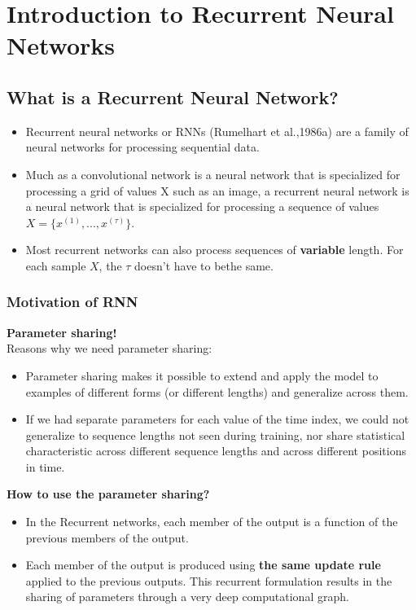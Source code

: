 \chapter{Introduction to Recurrent Neural Networks}

	\section{What is a Recurrent Neural Network?}
	
	\begin{itemize}
		\item Recurrent neural networks or RNNs (Rumelhart et al.,1986a) are a family of
		neural networks for processing sequential data.
		\item  Much as a convolutional network is a neural network that is specialized for processing a grid of values X such as an image, a recurrent neural network is a neural network that is specialized for
		processing a sequence of values $X = \{x^{(1)}, . . . , x^{(\tau)}\}$.
		\item Most recurrent networks can also process sequences of \textbf{variable} length. For each sample $X$, the $\tau$ doesn't have to bethe same.
	\end{itemize}
	
	\subsection{Motivation of RNN}
		\textbf{Parameter sharing!} \\
		Reasons why we need parameter sharing:
		\begin{itemize}
			\item  Parameter sharing makes it possible to extend and apply the model to examples of different forms
			(or different lengths) and generalize across them.
			\item  If we had separate parameters for each value of the time index, we could not generalize to sequence lengths not seen during training, nor share statistical characteristic across different sequence lengths
			and across different positions in time. 
		\end{itemize}
	
		\textbf{How to use the parameter sharing?}
		\begin{itemize}
			\item In the Recurrent networks, each member of the
			output is a function of the previous members of the output.	
			\item Each member of the output is produced using \textbf{the same update rule} applied to the previous outputs. This recurrent formulation results in the sharing of parameters through a very deep computational graph.
		\end{itemize}

